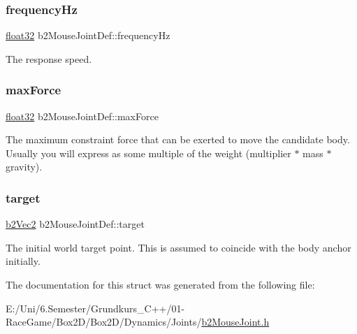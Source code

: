 \subsubsection{\texorpdfstring{frequencyHz}{frequencyHz}}
{\footnotesize\ttfamily \mbox{\hyperlink{b2_settings_8h_aacdc525d6f7bddb3ae95d5c311bd06a1}{float32}} b2\+Mouse\+Joint\+Def\+::frequency\+Hz}



The response speed. 

\mbox{\label{structb2_mouse_joint_def_ae9c52b3afda8ed006eb62fad163cdc3b}} 
\subsubsection{\texorpdfstring{maxForce}{maxForce}}
{\footnotesize\ttfamily \mbox{\hyperlink{b2_settings_8h_aacdc525d6f7bddb3ae95d5c311bd06a1}{float32}} b2\+Mouse\+Joint\+Def\+::max\+Force}

The maximum constraint force that can be exerted to move the candidate body. Usually you will express as some multiple of the weight (multiplier $\ast$ mass $\ast$ gravity). \mbox{\label{structb2_mouse_joint_def_aa1b76f72df9aca8d42bdc3e9922e310a}} 
\subsubsection{\texorpdfstring{target}{target}}
{\footnotesize\ttfamily \mbox{\hyperlink{structb2_vec2}{b2\+Vec2}} b2\+Mouse\+Joint\+Def\+::target}

The initial world target point. This is assumed to coincide with the body anchor initially. 

The documentation for this struct was generated from the following file\+:\begin{DoxyCompactItemize}
\item 
E\+:/\+Uni/6.\+Semester/\+Grundkurs\+\_\+\+C++/01-\/\+Race\+Game/\+Box2\+D/\+Box2\+D/\+Dynamics/\+Joints/\mbox{\hyperlink{b2_mouse_joint_8h}{b2\+Mouse\+Joint.\+h}}\end{DoxyCompactItemize}
